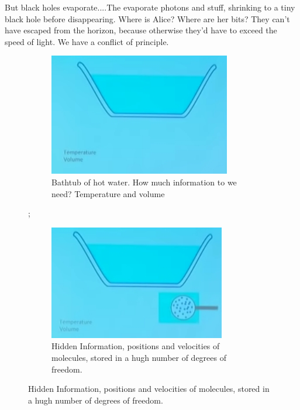 \documentclass[]{article}
\begin{document}
But black holes evaporate....The evaporate photons and stuff, shrinking to a tiny black hole before disappearing. Where is Alice? Where are her bits? They can't have escaped from the horizon, because otherwise they'd have to exceed the speed of light. We have a conflict of principle.

\begin{figure}[H]
	\caption{Entropy--Information that is hidden.}
	\begin{subfigure}[t]{0.45\textwidth}
		\caption{Bathtub of hot water. How much information to we need? Temperature and volume}
		\includegraphics[width=\textwidth]{wh-bathtub}
	\end{subfigure}
	;\
	\begin{subfigure}[t]{0.45\textwidth}
		\caption{Hidden Information, positions and velocities of molecules, stored in a hugh number of degrees of freedom.}
		\includegraphics[width=\textwidth]{wh-bathtub-detail}
	\end{subfigure}
\end{figure}
\end{document}
